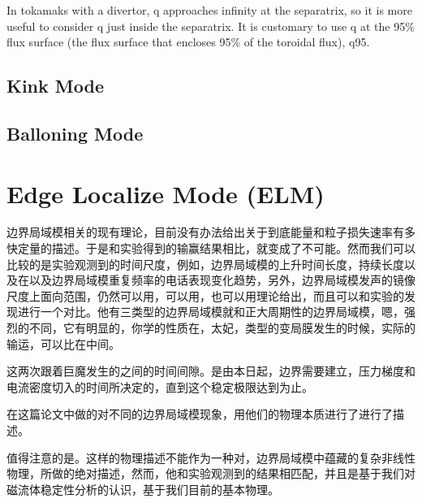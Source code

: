 In tokamaks with a divertor, q approaches infinity at the separatrix, so it is more useful to consider q just inside the separatrix. It is customary to use q at the 95\% flux surface (the flux surface that encloses 95\% of the toroidal flux), q95.
\subsection{Kink Mode}
\subsection{Balloning Mode}

\section{Edge Localize Mode (ELM)}
边界局域模相关的现有理论，目前没有办法给出关于到底能量和粒子损失速率有多快定量的描述。于是和实验得到的输赢结果相比，就变成了不可能。然而我们可以比较的是实验观测到的时间尺度，例如，边界局域模的上升时间长度，持续长度以及在以及边界局域模重复频率的电话表现变化趋势，另外，边界局域模发声的镜像尺度上面向范围，仍然可以用，可以用，也可以用理论给出，而且可以和实验的发现进行一个对比。他有三类型的边界局域模就和正大周期性的边界局域模，嗯，强烈的不同，它有明显的，你学的性质在，太妃，类型的变局膜发生的时候，实际的输运，可以比在中间。



这两次跟着巨魔发生的之间的时间间隙。是由本日起，边界需要建立，压力梯度和电流密度切入的时间所决定的，直到这个稳定极限达到为止。





在这篇论文中做的对不同的边界局域模现象，用他们的物理本质进行了进行了描述。


值得注意的是。这样的物理描述不能作为一种对，边界局域模中蕴藏的复杂非线性物理，所做的绝对描述，然而，他和实验观测到的结果相匹配，并且是基于我们对磁流体稳定性分析的认识，基于我们目前的基本物理。

